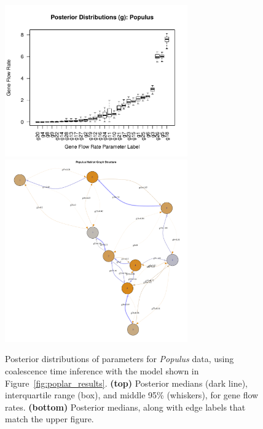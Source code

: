 \documentclass{article}
\begin{document}
\begin{figure}
\centering
    \includegraphics[width=0.7\textwidth]{poplars/posterior_dists_g_populus}
    \includegraphics[width=0.7\textwidth]{poplars/grid_populus}
    \caption{
        Posterior distributions of parameters for \textit{Populus} data,
        using coalescence time inference with the model shown in Figure~\ref{fig:poplar_results}.
        \textbf{(top)} Posterior medians (dark line),
        interquartile range (box), and middle 95\% (whiskers),
        for gene flow rates.
        \textbf{(bottom)} Posterior medians, along with edge labels that match the upper figure.
        \label{sfig:poplar_g}
    }
\end{figure}
\end{document}
